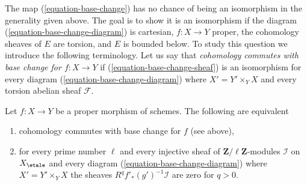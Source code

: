 \medskip\noindent
The map (\ref{equation-base-change}) has no chance of being an isomorphism
in the generality given above. The goal is to show
it is an isomorphism if the diagram (\ref{equation-base-change-diagram})
is cartesian, $f : X \to Y$ proper, the cohomology sheaves of $E$
are torsion, and $E$ is bounded below.
To study this question we introduce the following terminology.
Let us say that {\it cohomology commutes with base change
for $f : X \to Y$} if (\ref{equation-base-change-sheaf})
is an isomorphism for every diagram (\ref{equation-base-change-diagram})
where $X' = Y' \times_Y X$ and every torsion abelian sheaf $\mathcal{F}$.

\begin{lemma}
\label{lemma-proper-base-change-in-terms-of-injectives}
Let $f : X \to Y$ be a proper morphism of schemes.
The following are equivalent
\begin{enumerate}
\item cohomology commutes with base change for $f$ (see above),
\item for every prime number $\ell$ and every injective
sheaf of $\mathbf{Z}/\ell\mathbf{Z}$-modules $\mathcal{I}$
on $X_\etale$ and every diagram (\ref{equation-base-change-diagram})
where $X' = Y' \times_Y X$ the sheaves
$R^qf'_*(g')^{-1}\mathcal{I}$ are zero for $q > 0$.
\end{enumerate}
\end{lemma}

